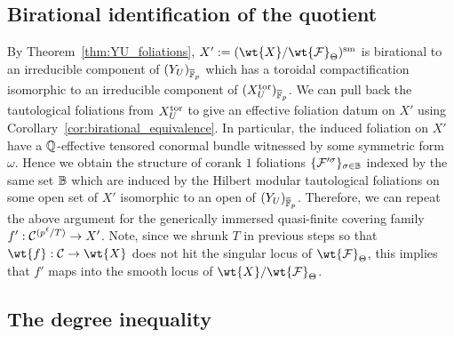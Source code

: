\documentclass[main.tex]{subfiles}
\begin{document}
{\subsection{Birational identification of the quotient}

By Theorem~\ref{thm:YU_foliations}, $X' := (\wt{X} / \wt{\F}_{\Theta})^{\smooth}$ is birational to an irreducible component of $(Y_U)_{\overline{\mathbb{F}}_p}$ which has a toroidal compactification isomorphic to an irreducible component of $(X_U^{\mathrm{tor}})_{\overline{\mathbb{F}}_p}$. We can pull back the tautological foliations from $X_U^{\mathrm{tor}}$ to give an effective foliation datum on $X'$ using Corollary~\ref{cor:birational_equivalence}. In particular, the induced foliation on $X'$ have a $\mathbb{Q}$-effective tensored conormal bundle witnessed by some symmetric form $\omega$.
Hence we obtain the structure of corank $1$ foliations $\{ \mathcal{F}'^{\sigma} \}_{\sigma \in \mathbb{B}}$ indexed by the same set $\mathbb{B}$ which are induced by the Hilbert modular tautological foliations on some open set of $X'$ isomorphic to an open of $(Y_U)_{\overline{\mathbb{F}}_p}$. Therefore, we can repeat the above argument for the generically immersed quasi-finite covering family $f' : \mathcal{C}^{(p^{\ell}/T)} \to X'$. Note, since we shrunk $T$ in previous steps so that $\wt{f} : \cC \to \wt{X}$ does not hit the singular locus of $\wt{\F}_{\Theta}$, this implies that $f'$ maps into the smooth locus of $\wt{X} / \wt{\F}_{\Theta}$. 

\subsection{The degree inequality} \label{section:degree_inequality}

}
\end{document}
